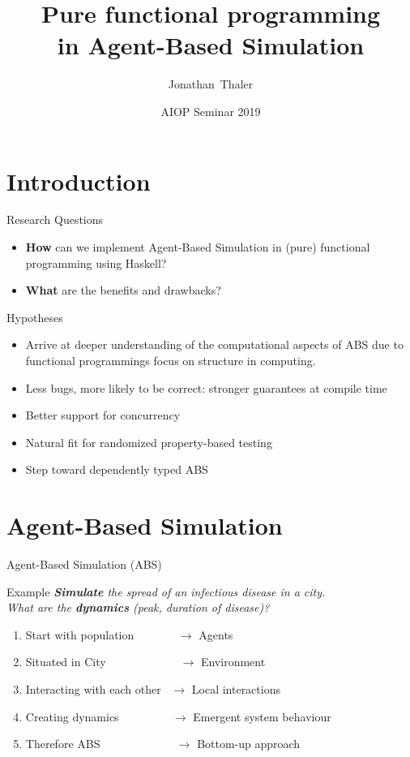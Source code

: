 \documentclass{beamer}
\title[Pure functional programming in Agent-Based Simulation] 
{%
  Pure functional programming \\ in Agent-Based Simulation
}
\author[Thaler]
{
  Jonathan~Thaler
}
\institute[University of Nottingham, Ningbo, China]
{
  University of Nottingham, Ningbo, China
}
\date[AIOP Seminar 2019]
{AIOP Seminar 2019}
\begin{document}
\begin{frame}
  \titlepage
\end{frame}


\section{Introduction}
\begin{frame}{Research Questions}
\begin{itemize}
  \item \textbf{How} can we implement Agent-Based Simulation in (pure) functional programming using Haskell?
  \item \textbf{What} are the benefits and drawbacks?
\end{itemize}
\end{frame}

\begin{frame}{Hypotheses}
\begin{itemize}
  \item Arrive at deeper understanding of the computational aspects of ABS due to functional programmings focus on structure in computing. 
  \item Less bugs, more likely to be correct: stronger guarantees at compile time
  \item Better support for concurrency
  \item Natural fit for randomized property-based testing
  \item Step toward dependently typed ABS
\end{itemize}
\end{frame}

\section{Agent-Based Simulation}
\begin{frame}{Agent-Based Simulation (ABS)} 
  \begin{block}{Example}
    \textit{\textbf{Simulate} the spread of an infectious disease in a city. \\ What are the \textbf{dynamics} (peak, duration of disease)?}
  \end{block}
  
  \begin{enumerate}
    \item Start with population \, \, \, \, \, \, \, $\to$ Agents
 	\item Situated in City \, \, \, \, \, \, \, \, \, \, \, \,\, $\to$ Environment
 	\item Interacting with each other \, $\to$ Local interactions
 	\item Creating dynamics \, \, \, \, \, \, \, \,\,\, $\to$ Emergent system behaviour
 	\item Therefore ABS \, \, \, \, \, \, \, \, \, \, \, \,\,\, $\to$ Bottom-up approach
  \end{enumerate}
\end{frame}
\end{document}
